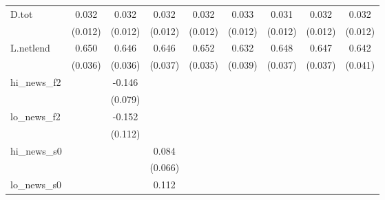 {\begin{tabular}{l*{8}{c}}
D.tot       &       0.032\sym{***}&       0.032\sym{***}&       0.032\sym{***}&       0.032\sym{***}&       0.033\sym{***}&       0.031\sym{***}&       0.032\sym{***}&       0.032\sym{***}\\
            &     (0.012)         &     (0.012)         &     (0.012)         &     (0.012)         &     (0.012)         &     (0.012)         &     (0.012)         &     (0.012)         \\
\addlinespace
L.netlend   &       0.650\sym{***}&       0.646\sym{***}&       0.646\sym{***}&       0.652\sym{***}&       0.632\sym{***}&       0.648\sym{***}&       0.647\sym{***}&       0.642\sym{***}\\
            &     (0.036)         &     (0.036)         &     (0.037)         &     (0.035)         &     (0.039)         &     (0.037)         &     (0.037)         &     (0.041)         \\
\addlinespace
hi\_news\_f2  &                     &      -0.146\sym{*}  &                     &                     &                     &                     &                     &                     \\
            &                     &     (0.079)         &                     &                     &                     &                     &                     &                     \\
\addlinespace
lo\_news\_f2  &                     &      -0.152         &                     &                     &                     &                     &                     &                     \\
            &                     &     (0.112)         &                     &                     &                     &                     &                     &                     \\
\addlinespace
hi\_news\_s0  &                     &                     &       0.084         &                     &                     &                     &                     &                     \\
            &                     &                     &     (0.066)         &                     &                     &                     &                     &                     \\
\addlinespace
lo\_news\_s0  &                     &                     &       0.112         &                     &                     &                     &                     &                     \\

\end{tabular}}
